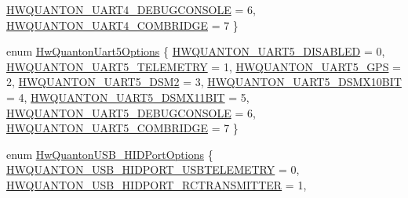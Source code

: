 \begin{DoxyCompactItemize}
\hyperlink{group___hw_quanton_gga161dfecbb08bcc9264ade8775b9a39c6a016679832df8db97de007707c4e10d83}{\-H\-W\-Q\-U\-A\-N\-T\-O\-N\-\_\-\-U\-A\-R\-T4\-\_\-\-D\-E\-B\-U\-G\-C\-O\-N\-S\-O\-L\-E} = 6, 
\hyperlink{group___hw_quanton_gga161dfecbb08bcc9264ade8775b9a39c6a8a91a76e45436c0b621cd2da407da9c3}{\-H\-W\-Q\-U\-A\-N\-T\-O\-N\-\_\-\-U\-A\-R\-T4\-\_\-\-C\-O\-M\-B\-R\-I\-D\-G\-E} = 7
 \}
\item 
enum \hyperlink{group___hw_quanton_ga54cb9133c5ca482d55500016eebc8765}{\-Hw\-Quanton\-Uart5\-Options} \{ \*
\hyperlink{group___hw_quanton_gga54cb9133c5ca482d55500016eebc8765a41c3d5a57dc7d5b188fcbdec4790e876}{\-H\-W\-Q\-U\-A\-N\-T\-O\-N\-\_\-\-U\-A\-R\-T5\-\_\-\-D\-I\-S\-A\-B\-L\-E\-D} = 0, 
\hyperlink{group___hw_quanton_gga54cb9133c5ca482d55500016eebc8765a7db7648971868d83d760baf2216c1db1}{\-H\-W\-Q\-U\-A\-N\-T\-O\-N\-\_\-\-U\-A\-R\-T5\-\_\-\-T\-E\-L\-E\-M\-E\-T\-R\-Y} = 1, 
\hyperlink{group___hw_quanton_gga54cb9133c5ca482d55500016eebc8765a424cfbbe6fe51024cffd36a3906dab15}{\-H\-W\-Q\-U\-A\-N\-T\-O\-N\-\_\-\-U\-A\-R\-T5\-\_\-\-G\-P\-S} = 2, 
\hyperlink{group___hw_quanton_gga54cb9133c5ca482d55500016eebc8765a659126c40c5257b6c61f2e69f8871a5f}{\-H\-W\-Q\-U\-A\-N\-T\-O\-N\-\_\-\-U\-A\-R\-T5\-\_\-\-D\-S\-M2} = 3, 
\*
\hyperlink{group___hw_quanton_gga54cb9133c5ca482d55500016eebc8765a1797ead4edf7e2d32c3a152ffe0303f2}{\-H\-W\-Q\-U\-A\-N\-T\-O\-N\-\_\-\-U\-A\-R\-T5\-\_\-\-D\-S\-M\-X10\-B\-I\-T} = 4, 
\hyperlink{group___hw_quanton_gga54cb9133c5ca482d55500016eebc8765ab0edb64a43eaacd06eccfc6908918066}{\-H\-W\-Q\-U\-A\-N\-T\-O\-N\-\_\-\-U\-A\-R\-T5\-\_\-\-D\-S\-M\-X11\-B\-I\-T} = 5, 
\hyperlink{group___hw_quanton_gga54cb9133c5ca482d55500016eebc8765a407abe7804b347621d035f87cf15afaa}{\-H\-W\-Q\-U\-A\-N\-T\-O\-N\-\_\-\-U\-A\-R\-T5\-\_\-\-D\-E\-B\-U\-G\-C\-O\-N\-S\-O\-L\-E} = 6, 
\hyperlink{group___hw_quanton_gga54cb9133c5ca482d55500016eebc8765ace2f23f4572c49d4ac481260101be68b}{\-H\-W\-Q\-U\-A\-N\-T\-O\-N\-\_\-\-U\-A\-R\-T5\-\_\-\-C\-O\-M\-B\-R\-I\-D\-G\-E} = 7
 \}
\item 
enum \hyperlink{group___hw_quanton_ga6032651edd94cb4e24e1b333c8ea7e64}{\-Hw\-Quanton\-U\-S\-B\-\_\-\-H\-I\-D\-Port\-Options} \{ \hyperlink{group___hw_quanton_gga6032651edd94cb4e24e1b333c8ea7e64aa20bbfdbd495114a366fef24888a70ad}{\-H\-W\-Q\-U\-A\-N\-T\-O\-N\-\_\-\-U\-S\-B\-\_\-\-H\-I\-D\-P\-O\-R\-T\-\_\-\-U\-S\-B\-T\-E\-L\-E\-M\-E\-T\-R\-Y} = 0, 
\hyperlink{group___hw_quanton_gga6032651edd94cb4e24e1b333c8ea7e64a79e610ece0d99ceb7cf00e5f6daf7a65}{\-H\-W\-Q\-U\-A\-N\-T\-O\-N\-\_\-\-U\-S\-B\-\_\-\-H\-I\-D\-P\-O\-R\-T\-\_\-\-R\-C\-T\-R\-A\-N\-S\-M\-I\-T\-T\-E\-R} = 1, 

\end{DoxyCompactItemize}
